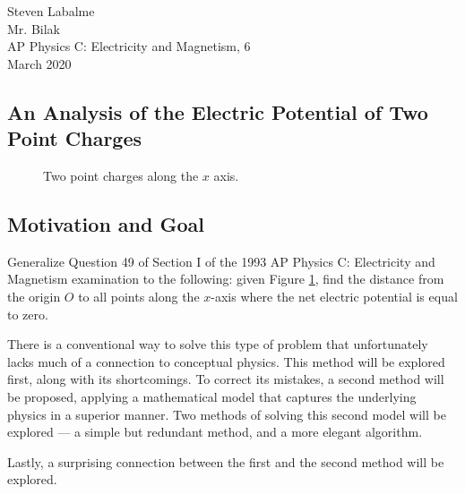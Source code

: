 \documentclass[titlepage]{article}
\begin{document}
\noindent Steven Labalme\\
\noindent Mr. Bilak\\
\noindent AP Physics C: Electricity and Magnetism, 6\\
 March 2020\\
\begin{center}
    \section*{An Analysis of the Electric Potential of Two Point Charges}
\end{center}

\begin{figure}[h!]
    \centering
    \caption{Two point charges along the $x$ axis.}
    \label{fig:2charges}
\end{figure}

\subsection*{Motivation and Goal}
Generalize Question 49 of Section I of the 1993 AP Physics C: Electricity and Magnetism examination to the following: given Figure \ref{fig:2charges}, find the distance from the origin $O$ to all points along the $x$-axis where the net electric potential is equal to zero.\par
There is a conventional way to solve this type of problem that unfortunately lacks much of a connection to conceptual physics. This method will be explored first, along with its shortcomings. To correct its mistakes, a second method will be proposed, applying a mathematical model that captures the underlying physics in a superior manner. Two methods of solving this second model will be explored --- a simple but redundant method, and a more elegant algorithm.\par
Lastly, a surprising connection between the first and the second method will be explored.
\end{document}
